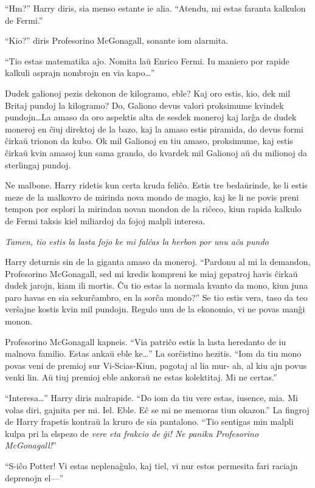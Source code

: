 ``Hm?'' Harry diris, sia menso estante ie alia. ``Atendu, mi estas
faranta kalkulon de Fermi.''

``Kio?'' diris Profesorino McGonagall, sonante iom alarmita.

``Tio estas matematika aĵo. Nomita laŭ Enrico Fermi. Iu maniero por rapide kalkuli
asprajn nombrojn en via kapo\ldots''

Dudek galionoj pezis dekonon de kilogramo, eble? Kaj oro estis,
kio, dek mil Britaj pundoj la kilogramo? Do, Galiono devus valori
proksimume kvindek pundojn\ldots La amaso da oro aspektis alta de
sesdek moneroj kaj larĝa de dudek moneroj en ĉiuj direktoj de la bazo,
kaj la amaso estis piramida, do devus formi ĉirkaŭ trionon da kubo. Ok
mil Galionoj en tiu amaso, proksimume, kaj estis ĉirkaŭ kvin amasoj
kun sama grando, do kvardek mil Galionoj aŭ du milionoj da sterlingaj
pundoj.

Ne malbone. Harry ridetis kun certa kruda feliĉo. Estis tre
bedaŭrinde, ke li estis meze de la malkovro de mirinda nova mondo de
magio, kaj ke li ne povis preni tempon por esplori la mirindan novan
mondon de la riĉeco, kiun rapida kalkulo de Fermi taksis kiel
miliardoj da fojoj malpli interesa.

\emph {Tamen, tio estis la lasta fojo ke mi falĉas la herbon por unu
  aĉa pundo}

Harry deturnis sin de la giganta amaso da moneroj. ``Pardonu al mi la
demandon, Profesorino McGonagall, sed mi kredis kompreni ke miaj
gepatroj havis ĉirkaŭ dudek jarojn, kiam ili mortis. Ĉu tio estas la
normala kvanto da mono, kiun juna paro havas en sia sekurĉambro, en la
sorĉa mondo?'' Se tio estis vera, taso da teo verŝajne kostis kvin mil
pundojn. Regulo unu de la ekonomio, vi ne povas manĝi monon.

Profesorino McGonagall kapneis. ``Via patriĉo estis la lasta heredanto
de iu malnova familio. Estas ankaŭ eble ke\ldots'' La sorĉistino
hezitis. ``Iom da tiu mono povas veni de premioj sur Vi-Scias-Kiun,
pagotaj al lia mur- ah, al kiu ajn povus venki lin. Aŭ tiuj premioj
eble ankoraŭ ne estas kolektitaj. Mi ne certas.''

``Interesa\ldots'' Harry diris malrapide. ``Do iom da tiu vere estas,
iusence, mia. Mi volas diri, gajnita per mi. Iel. Eble. Eĉ se mi ne
memoras tiun okazon.'' La fingroj de Harry frapetis kontraŭ la kruro
de sia pantalono. ``Tio sentigas min malpli kulpa pri la elspezo de
\emph{vere eta frakcio de ĝi! Ne paniku Profesorino McGonagall!}''

``S-iĉo Potter! Vi estas neplenaĝulo, kaj tiel, vi nur estos permesita
fari raciajn deprenojn el—''

